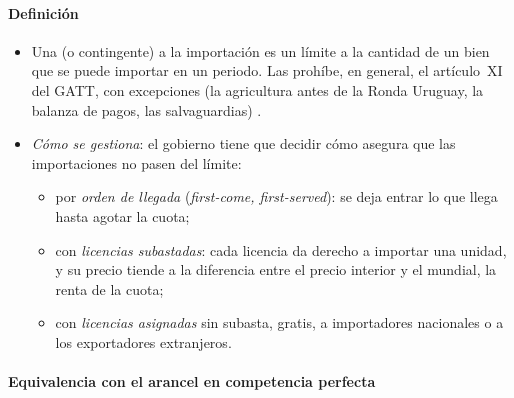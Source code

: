 \documentclass[11pt]{article}
\begin{document}
\paragraph{Definición}

\begin{itemize}
\item Una  (o contingente) a la importación es un límite a la cantidad de un bien que se puede importar en un periodo. Las prohíbe, en general, el artículo~XI del GATT, con excepciones (la agricultura antes de la Ronda Uruguay, la balanza de pagos, las salvaguardias)\nocite{OMC1994GATT} .
\item \emph{Cómo se gestiona}: el gobierno tiene que decidir cómo asegura que las importaciones no pasen del límite:
  \begin{itemize}
  \item por \emph{orden de llegada} (\emph{first-come, first-served}): se deja entrar lo que llega hasta agotar la cuota;
  \item con \emph{licencias subastadas}: cada licencia da derecho a importar una unidad, y su precio tiende a la diferencia entre el precio interior y el mundial, la renta de la cuota;
  \item con \emph{licencias asignadas} sin subasta, gratis, a importadores nacionales o a los exportadores extranjeros.
  \end{itemize}
\end{itemize}

\paragraph{Equivalencia con el arancel en competencia perfecta}
\end{document}

